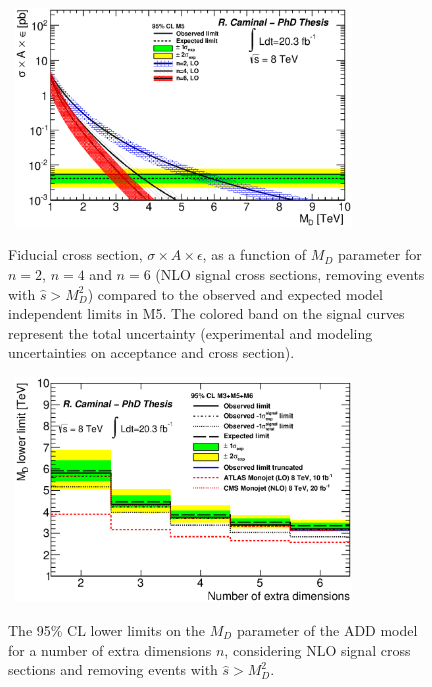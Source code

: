\begin{figure}[!ht]
\begin{center}
\mbox{
\includegraphics[width=0.795\textwidth]{Interpretations/Figures/ModelIndependentADD_NLO_truncated_Stop_A9.eps}
}
\end{center}
\caption[Fiducial cross section, $\sigma \times A \times \epsilon$, for the ADD LED model as a function of $M_D$ parameter for $n=2$, $n=4$ and $n=6$ (NLO signal cross sections, removing events with $\hat{s} > M_D$) compared to the observed and expected model independent limits in the signal region M5.]{Fiducial cross section, $\sigma \times A \times \epsilon$, as a function of $M_D$ parameter for $n=2$, $n=4$ and $n=6$ (NLO signal cross sections, removing events with $\hat{s} > M_D^2$) compared to the observed and expected model independent limits in M5. The colored band on the signal curves represent the total uncertainty (experimental and modeling uncertainties on acceptance and cross section).}
\label{fig:ADDModelIndependentNLOtruncatedM5}
\end{figure}




\begin{figure}[!ht]
\begin{center}
\mbox{
\includegraphics[width=0.795\textwidth]{Interpretations/Figures/plotExclusionADD_ALLDistr_NLO_combined_Stop_A4_A9_A10.eps}
}
\end{center}
\caption{The 95\% CL lower limits on the $M_D$ parameter of the ADD model for a number of extra dimensions $n$, considering NLO signal cross sections and removing events with $\hat{s} > M_D^2$.}
\label{fig:ADDExclusionNLOtruncatedCombined}
\end{figure}

\clearpage

